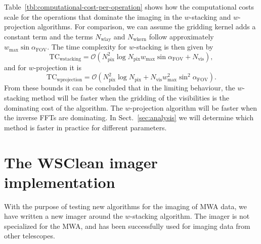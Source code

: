 \documentclass[useAMS,usenatbib]{mn2e}
\begin{document}
Table~\ref{tbl:computational-cost-per-operation} shows how the computational costs scale for the operations that dominate the imaging in the $w$-stacking and $w$-projection algorithms. For comparison, we can assume the gridding kernel adds a constant term and the terms $N_\textrm{wlay}$ and $N_\textrm{wkern}$ follow approximately $w_{\max} \sin \alpha_\textrm{FOV}$. The time complexity for $w$-stacking is then given by
\begin{equation}
\textrm{TC}_\textrm{wstacking}=\mathcal{O}\left(N^2_\textrm{pix} \log N_\textrm{pix} w_{\max} \sin \alpha_\textrm{FOV}+ N_\textrm{vis} \right),
\end{equation}
and for $w$-projection it is
\begin{equation}
\textrm{TC}_\textrm{wprojection}=\mathcal{O}\left(N^2_\textrm{pix} \log N_\textrm{pix} + N_\textrm{vis} w_{\max}^2 \sin^2 \alpha_\textrm{FOV}\right).
\end{equation}
From these bounds it can be concluded that in the limiting behaviour, the $w$-stacking method will be faster when the gridding of the visibilities is the dominating cost of the algorithm. The $w$-projection algorithm will be faster when the inverse FFTs are dominating. In Sect.~\ref{sec:analysis} we will determine which method is faster in practice for different parameters.

\section{The WSClean imager implementation} \label{sec:implementation}
With the purpose of testing new algorithms for the imaging of MWA data, we have written a new imager around the $w$-stacking algorithm. The imager is not specialized for the MWA, and has been successfully used for imaging data from other telescopes.
\end{document}
